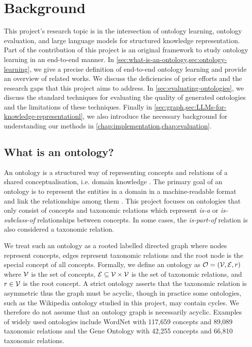 \chapter{Background}

This project's research topic is in the intersection of ontology learning, ontology evaluation, and large language models for structured knowledge representation. Part of the contribution of this project is an original framework to study ontology learning in an end-to-end manner. In \cref{sec:what-is-an-ontology,sec:ontology-learning}, we give a precise definition of end-to-end ontology learning and provide an overview of related works. We discuss the deficiencies of prior efforts and the research gaps that this project aims to address. In \cref{sec:evaluating-ontologies}, we discuss the standard techniques for evaluating the quality of generated ontologies and the limitations of these techniques. Finally in \cref{sec:graph,sec:LLMs-for-knowledge-representationl}, we also introduce the necessary background for understanding our methods in \cref{chap:implementation,chap:evaluation}.

\section{What is an ontology?}  \label{sec:what-is-an-ontology}

An ontology is a structured way of representing concepts and relations of a shared conceptualisation, i.e. domain knowledge \cite{gruber1995toward,gruber1993translation}. The primary goal of an ontology is to represent the entities in a domain in a machine-readable format and link the relationships among them \cite{national2022ontologies}. This project focuses on ontologies that only consist of concepts and taxonomic relations which represent \emph{is-a} or \emph{is-subclass-of} relationships between concepts. In some cases, the \emph{is-part-of} relation is also considered a taxonomic relation.

We treat such an ontology as a rooted labelled directed graph where nodes represent concepts, edges represent taxonomic relations and the root node is the special concept of all concepts. Formally, we define an ontology as $\mathcal{O} = (\mathcal{V}, \mathcal{E}, r)$ where $\mathcal{V}$ is the set of concepts, $\mathcal{E} \subseteq \mathcal{V} \times \mathcal{V}$ is the set of taxonomic relations, and $r \in \mathcal{V}$ is the root concept. A strict ontology asserts that the taxonomic relation is asymmetric thus the graph must be acyclic, though in practice some ontologies, such as the Wikipedia ontology studied in this project, may contain cycles. We therefore do not assume that an ontology graph is necessarily acyclic. Examples of widely used ontologies include WordNet \cite{miller1995wordnet} with 117,659 concepts and 89,089 taxonomic relations and the Gene Ontology \cite{ashburner2000gene} with 42,255 concepts and 66,810 taxonomic relations.

